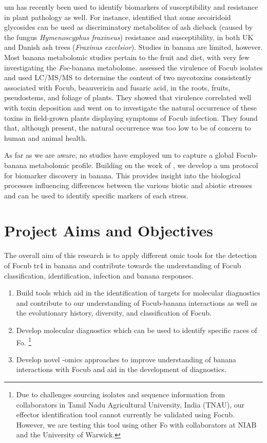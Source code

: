 \ac{um} has recently been used to identify biomarkers of susceptibility and resistance in plant pathology as well. For instance, \textcite{Sambles2017, Sidda2020} identified that some secoiridoid glycosides can be used as discriminatory metabolites of ash dieback  (caused by the fungus \textit{Hymenoscyphus fraxineus}) resistance and susceptibility,  in both UK and Danish ash trees (\textit{Fraxinus excelsior}). Studies in banana are limited, however. Most banana metabolomic studies pertain to the fruit and diet, with very few investigating the \textit{Foc}-banana metabolome. \textcite{Li2013c} assessed the virulence of \ac{Focub} isolates and used LC/MS/MS to determine the content of two mycotoxins consistently associated with \ac{Focub}, beauvericin and fusaric acid, in the roots, fruits, pseudostems, and foliage of plants. They showed that virulence correlated well with toxin deposition and went on to investigate the natural occurrence of these toxins in field-grown plants displaying symptoms of \ac{Focub} infection. They found that, although present, the natural occurrence was too low to be of concern to human and animal health.

As far as we are aware, no studies have employed \ac{um} to capture a global \ac{Focub}-banana metabolomic profile. Building on the work of \textcite{Sambles2017, Sidda2020}, we develop a \ac{um} protocol for biomarker discovery in banana. This provides insight into the biological processes influencing differences between the various biotic and abiotic stresses  and can be used to identify specific markers of each stress.

\newpage
\section{Project Aims and Objectives}

The overall aim of this research is to apply different omic tools for the detection of \acl{Focub} \ac{tr4} in banana and contribute towards the understanding of \acl{Focub} classification, identification, infection and banana responses. 

\begin{enumerate}
    \item Build tools which aid in the identification of targets for molecular diagnostics and contribute to our understanding of \ac{Focub}-banana interactions as well as the evolutionary history, diversity, and classification of \ac{Focub}. 
    \item Develop molecular diagnostics which can be used to identify specific races of \acl{Fo}. \footnote{Due to challenges sourcing isolates and sequence information from collaborators in Tamil Nadu Agricultural University, India (TNAU), our effector identification tool cannot currently be validated using \ac{Focub}. However, we are testing this tool using other \acl{Fo}  with collaborators at NIAB and the University of Warwick.} 
    \item Develop novel -omics approaches to improve understanding of banana interactions with \ac{Focub} and aid in the development of diagnostics.
\end{enumerate}

